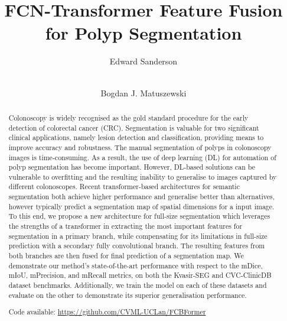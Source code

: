 \documentclass[runningheads]{llncs}
\begin{document}
\title{FCN-Transformer Feature Fusion for Polyp Segmentation}



\author{Edward Sanderson \and{} \and \\
Bogdan J. Matuszewski}





\maketitle
\begin{abstract}

Colonoscopy is widely recognised as the gold standard procedure for the early detection of colorectal cancer (CRC). Segmentation is valuable for two significant clinical applications, namely lesion detection and classification, providing means to improve accuracy and robustness. The manual segmentation of polyps in colonoscopy images is time-consuming. As a result, the use of deep learning (DL) for automation of polyp segmentation has become important. However, DL-based solutions can be vulnerable to overfitting and the resulting inability to generalise to images captured by different colonoscopes. Recent transformer-based architectures for semantic segmentation both achieve higher performance and generalise better than alternatives, however typically predict a segmentation map of  spatial dimensions for a  input image. To this end, we propose a new architecture for full-size segmentation which leverages the strengths of a transformer in extracting the most important features for segmentation in a primary branch, while compensating for its limitations in full-size prediction with a secondary fully convolutional branch. The resulting features from both branches are then fused for final prediction of a  segmentation map. We demonstrate our method's state-of-the-art performance with respect to the mDice, mIoU, mPrecision, and mRecall metrics, on both the Kvasir-SEG and CVC-ClinicDB dataset benchmarks. Additionally, we train the model on each of these datasets and evaluate on the other to demonstrate its superior generalisation performance.

Code available: \url{https://github.com/CVML-UCLan/FCBFormer}


\end{abstract}
\end{document}

